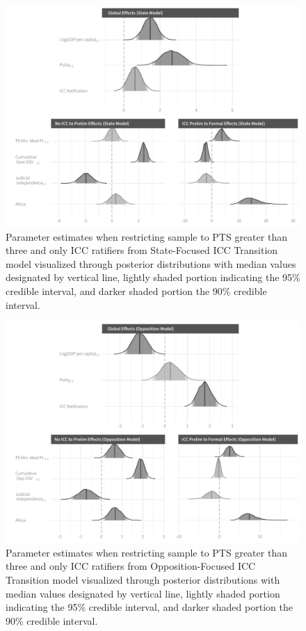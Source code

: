 \begin{figure}
    \centering
    \includegraphics[width=1\textwidth]{stateCoefSumm_ptsCivilWarOnly.pdf}
    \caption{Parameter estimates when restricting sample to PTS greater than three and only ICC ratifiers from State-Focused ICC Transition model visualized through posterior distributions with median values designated by vertical line, lightly shaded portion indicating the 95\% credible interval, and darker shaded portion the 90\% credible interval.}
    \label{fig:stateModel_pts3_icc1}
\end{figure}

\begin{figure}
    \centering
    \includegraphics[width=1\textwidth]{rebelCoefSumm_ptsCivilWarOnly.pdf}
    \caption{Parameter estimates  when restricting sample to PTS greater than three and only ICC ratifiers from Opposition-Focused ICC Transition model visualized through posterior distributions with median values designated by vertical line, lightly shaded portion indicating the 95\% credible interval, and darker shaded portion the 90\% credible interval.}
    \label{fig:rebelModel_pts3_icc1}
\end{figure}

